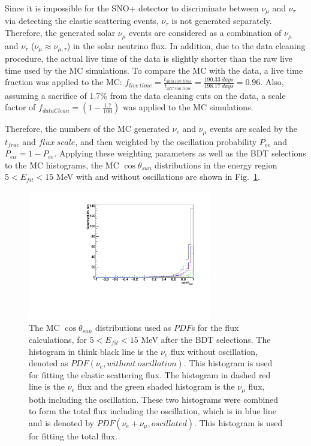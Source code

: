 Since it is impossible for the SNO+ detector to discriminate between $\nu_\mu$ and $\nu_\tau$ via detecting the elastic scattering events, $\nu_\tau$ is not generated separately\cite{marzec2019measurement}. Therefore, the generated solar $\nu_\mu$ events are considered as a combination of $\nu_\mu$ and $\nu_\tau$ ($\nu_\mu\approx\nu_{\mu,\tau}$) in the solar neutrino flux. In addition, due to the data cleaning procedure, the actual live time of the data is slightly shorter than the raw live time used by the MC simulations. To compare the MC with the data, a live time fraction was applied to the MC: $f_{live~time}=\frac{t_{data~live~time}}{t_{MC~run~time}}=\frac{190.33~days}{198.17~days} = 0.96$. Also, assuming a sacrifice of 1.7\% from the data cleaning cuts on the data, a scale factor of $f_{dataClean}=(1-\frac{1.7}{100})$ was applied to the MC simulations.

Therefore, the numbers of the MC generated $\nu_e$ and $\nu_\mu$ events are scaled by the $t_{frac}$ and $flux~scale$, and then weighted by the oscillation probability $P_{ee}$ and $P_{e\alpha}=1-P_{ee}$. Applying these weighting parameters as well as the BDT selections to the MC histograms, the MC $\cos\theta_{sun}$ distributions in the energy region $5<E_{fit}<15$ MeV with and without oscillations are shown in Fig.~\ref{fig:MCfluxPdfs}.

\begin{figure}[!htb]
	\centering
	\includegraphics[width=8cm]{MCfluxPdfs.pdf}
	\caption[The MC $\cos\theta_{sun}$ distributions used as $PDF$s for the flux calculations, for $5<E_{fit}<15$ MeV after the BDT selections.]{The MC $\cos\theta_{sun}$ distributions used as $PDF$s for the flux calculations, for $5<E_{fit}<15$ MeV after the BDT selections. The histogram in think black line is the $\nu_e$ flux without oscillation, denoted as $PDF(\nu_e,without~oscillation)$. This histogram is used for fitting the elastic scattering flux. The histogram in dashed red line is the $\nu_e$ flux and the green shaded histogram is the $\nu_\mu$ flux, both including the oscillation. These two histograms were combined to form the total flux including the oscillation, which is in blue line and is denoted by $PDF(\nu_e+\nu_\mu,oscillated)$. This histogram is used for fitting the total flux.}
	\label{fig:MCfluxPdfs}
\end{figure} 

